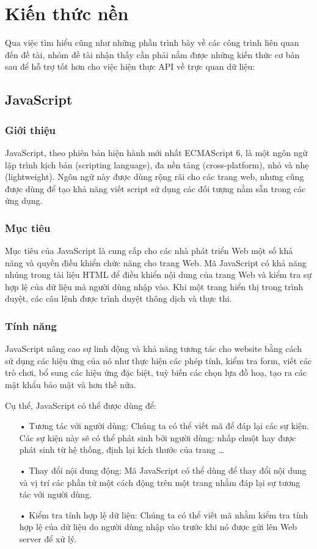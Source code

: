 \documentclass[12pt,a4paper]{article}
\begin{document}
\section{Kiến thức nền}
Qua việc tìm hiểu cũng như những phần trình bày về các công trình liên quan đến đề tài, nhóm đề tài nhận thấy cần phải nắm được những kiến thức cơ bản sau để hỗ trợ tốt hơn cho việc hiện thực API về trực quan dữ liệu:
\subsection{JavaScript}
\subsubsection{Giới thiệu}
JavaScript\citep{jsintro}, theo phiên bản hiện hành mới nhất ECMAScript 6\cite{es6}, là một ngôn ngữ lập trình kịch bản (scripting language), đa nền tảng (cross-platform), nhỏ và nhẹ (lightweight). Ngôn ngữ này được dùng rộng rãi cho các trang web, nhưng cũng được dùng để tạo khả năng viết script sử dụng các đối tượng nằm sẵn trong các ứng dụng.

\subsubsection{Mục tiêu}
Mục tiêu của JavaScript là cung cấp cho các nhà phát triển Web một số khả năng và quyền điều khiển chức năng cho trang Web. Mã JavaScript có khả năng nhúng trong tài liệu HTML để điều khiển nội dung của trang Web và kiểm tra sự hợp lệ của dữ liệu mà người dùng nhập vào. Khi một trang hiển thị trong trình duyệt, các câu lệnh được trình duyệt thông dịch và thực thi.

\subsubsection{Tính năng}
JavaScript nâng cao sự linh động và khả năng tương tác cho website bằng cách sử dụng các hiệu ứng của nó như thực hiện các phép tính, kiểm tra form, viết các trò chơi, bổ sung các hiệu ứng đặc biệt, tuỳ biến các chọn lựa đồ hoạ, tạo ra các mật khẩu bảo mật và hơn thế nữa.

Cụ thể, JavaScript có thể được dùng để:
\begin{itemize}
\item[•] Tương tác với người dùng: Chúng ta có thể viết mã để đáp lại các sự kiện. Các sự kiện này sẽ có thể phát sinh bởi người dùng: nhấp chuột hay được phát sinh từ hệ thống, định lại kích thước của trang …

\item[•] Thay đổi nội dung động: Mã JavaScript có thể dùng để thay đổi nội dung và vị trí các phần tử một cách động trên một trang nhằm đáp lại sự tương tác với người dùng.

\item[•] Kiểm tra tính hợp lệ dữ liệu: Chúng ta có thể viết mã nhằm kiểm tra tính hợp lệ của dữ liệu do người dùng nhập vào trước khi nó được gửi lên Web server để xử lý.
\end{itemize}
\end{document}
